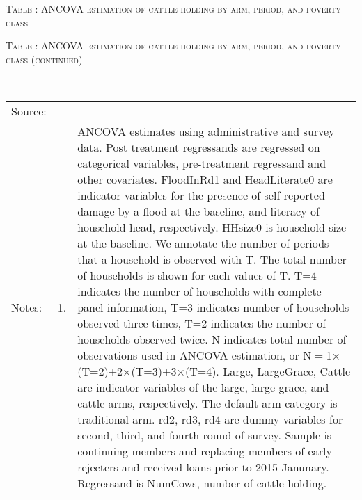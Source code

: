 \hspace{-1cm}\begin{minipage}[t]{14cm}
\hfil\textsc{\normalsize Table \thetable: ANCOVA estimation of cattle holding by arm, period, and poverty class\label{tab NumCowsExperienceTimeVaryingPovertyStatusANCOVA}}\\
\setlength{\tabcolsep}{1pt}
\setlength{\baselineskip}{8pt}
\renewcommand{\arraystretch}{.55}
\hfil{}
\end{minipage}

\hspace{-1cm}\begin{minipage}[t]{14cm}
\hfil\textsc{\normalsize Table \thetable: ANCOVA estimation of cattle holding by arm, period, and poverty class (continued)\label{tab ANCOVA cow time varying poverty2}}\\
\setlength{\tabcolsep}{1pt}
\setlength{\baselineskip}{8pt}
\renewcommand{\arraystretch}{.55}
\hfil{}\\
\renewcommand{\arraystretch}{.8}
\setlength{\tabcolsep}{1pt}
\begin{tabular}{>{\hfill\scriptsize}p{1cm}<{}>{\hfill\scriptsize}p{.25cm}<{}>{\scriptsize}p{12cm}<{\hfill}}
Source:& \multicolumn{2}{l}{\scriptsize Estimated with GUK administrative and survey data.}\\
Notes: & 1. & ANCOVA estimates using administrative and survey data. Post treatment regressands are regressed on categorical variables, pre-treatment regressand and other covariates. \textsf{FloodInRd1} and \textsf{HeadLiterate0} are indicator variables for the presence of self reported damage by a flood at the baseline, and literacy of household head, respectively. \textsf{HHsize0} is household size at the baseline. We annotate the number of periods that a household is observed with \textsf{T}. The total number of households is shown for each values of \textsf{T}. \textsf{T=4} indicates the number of households with complete panel information, \textsf{T=3} indicates number of households observed three times, \textsf{T=2} indicates the number of households observed twice. \textsf{N} indicates total number of observations used in ANCOVA estimation, or \textsf{N$=$1$\times$(T=2)+2$\times$(T=3)+3$\times$(T=4)}.  \textsf{Large}, \textsf{LargeGrace}, \textsf{Cattle} are indicator variables of the \textsf{large}, \textsf{large grace}, and \textsf{cattle} arms, respectively. The default arm category is \textsf{traditional} arm. \textsf{rd2, rd3, rd4} are dummy variables for second, third, and fourth round of survey. Sample is continuing members and replacing members of early rejecters and received loans prior to 2015 Janunary. Regressand is \textsf{NumCows}, number of cattle holding. \\

\end{tabular}
\end{minipage}
